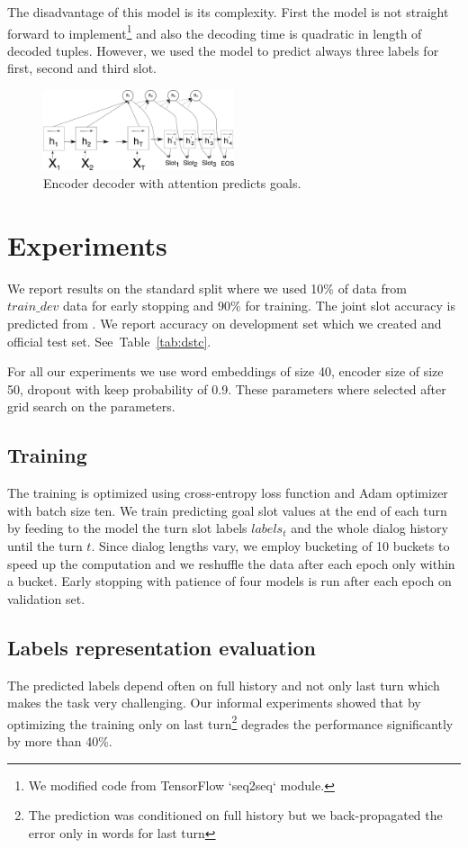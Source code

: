 \documentclass{itatnew}
\begin{document}
The disadvantage of this model is its complexity.
First the model is not straight forward to implement\footnote{We modified code from TensorFlow `seq2seq` module.} and also the decoding time is quadratic in length of decoded tuples.
However, we used the model to predict always three labels for first, second and third slot.
\begin{figure}
\includegraphics[width=0.5\textwidth]{encdec}
\caption{Encoder decoder with attention predicts goals.}
\label{fig:encdec}
\end{figure}

\section{Experiments}
We report results on the standard split where we used 10\% of data from $train\_dev$ data for early stopping\cite{early stopping} and 90\% for training.
The joint slot accuracy is predicted from .
We report accuracy  on development set which we created and official test set. See~Table~\ref{tab:dstc}.

For all our experiments we use word embeddings of size 40, encoder size of size 50, dropout with keep probability of 0.9.
These parameters where selected after grid search on the parameters.

\subsection{Training}
The training is optimized using cross-entropy loss function and Adam optimizer\cite{todo_adam} with batch size ten.
We train predicting goal slot values at the end of each turn by feeding to the model the turn slot labels $labels_t$ and the whole dialog history until the turn $t$.
Since dialog lengths vary, we employ bucketing of 10 buckets to speed up the computation and we reshuffle the data after each epoch only within a bucket.
Early stopping with patience of four models is run after each epoch on validation set.

\subsection{Labels representation evaluation}
The predicted labels depend often on full history and not only last turn which makes the task very challenging.
Our informal experiments showed that by optimizing the training only on last turn\footnote{The prediction was conditioned on full history but we back-propagated the error only in words for last turn} degrades the performance significantly by more than 40\%. 
\end{document}

